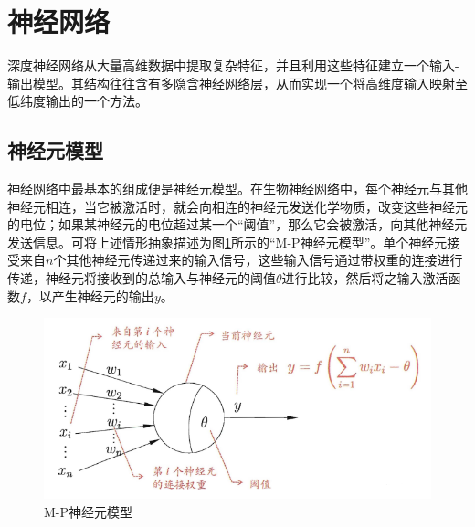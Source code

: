 \documentclass[zihao = -4,cn]{oucart}
\begin{document}
\section{神经网络}
深度神经网络从大量高维数据中提取复杂特征，并且利用这些特征建立一个输入-输出模型。其结构往往含有多隐含神经网络层，从而实现一个将高维度输入映射至低纬度输出的一个方法。

\subsection{神经元模型}
神经网络中最基本的组成便是神经元模型。在生物神经网络中，每个神经元与其他神经元相连，当它被激活时，就会向相连的神经元发送化学物质，改变这些神经元的电位；如果某神经元的电位超过某一个“阈值”，那么它会被激活，向其他神经元发送信息。可将上述情形抽象描述为图\ref{fig:unit}所示的“M-P神经元模型”。单个神经元接受来自$n$个其他神经元传递过来的输入信号，这些输入信号通过带权重的连接进行传递，神经元将接收到的总输入与神经元的阈值$\theta$进行比较，然后将之输入激活函数$f$，以产生神经元的输出$y$。
\begin{figure}[h]
	\centering %
	\includegraphics[scale=0.7]{assets/unit}
	\caption{M-P神经元模型}
	\label{fig:unit}
\end{figure}
\end{document}
